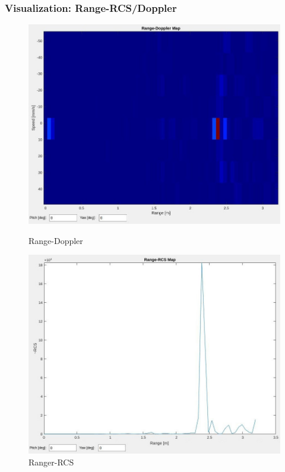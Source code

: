 \documentclass[aspectratio=43]{beamer}
\begin{document}
\begin{frame}[fragile]
  \frametitle{Visualization: Range-RCS/Doppler}
  \begin{figure}[!htb]
    \begin{minipage}{0.48\textwidth}
      \centering
      \includegraphics[width=\textwidth]{../img/vis_range_dop.jpg}
      \caption{Range-Doppler}
    \end{minipage}\hfill
    \begin{minipage}{0.48\textwidth}
      \centering
      \includegraphics[width=\textwidth]{../img/vis_range_rcs.jpg}
      \caption{Ranger-RCS}
    \end{minipage}
  \end{figure}
\end{frame}
\end{document}
